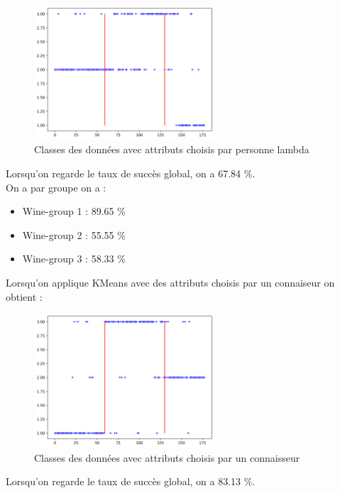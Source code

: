 \documentclass[a4paper,12pt]{article}
\begin{document}
\begin{figure}[h!] %
   \centering
   \includegraphics[width=0.6\textwidth]{normal_atributes.png} %
   \caption{Classes des données avec attributs choisis par personne lambda}
\end{figure}


Lorsqu'on regarde le taux de succès global, on a 67.84 \%.\\

On a par groupe on a :
\begin{itemize}
\item Wine-group 1 : 89.65 \%
\item Wine-group 2 : 55.55 \%
\item Wine-group 3 : 58.33 \%
\end{itemize}

\vspace{10pt}

Lorsqu'on applique KMeans avec des attributs choisis par un connaiseur on obtient :

\begin{figure}[h!] %
   \centering
   \includegraphics[width=0.6\textwidth]{profetional_atributes.png} %
   \caption{Classes des données avec attributs choisis par un connaisseur}
\end{figure}
\newpage
Lorsqu'on regarde le taux de succès global, on a 83.13 \%.\\
\end{document}

